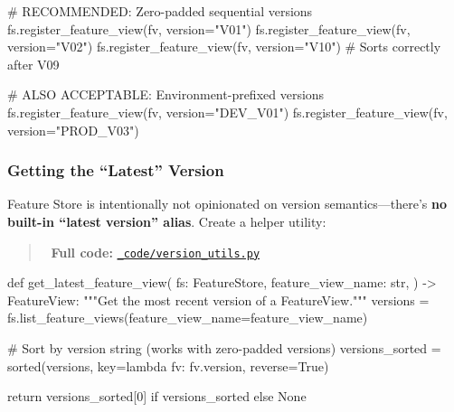 \documentclass[
  letterpaper,
  DIV=11,
  numbers=noendperiod]{scrreprt}
\newenvironment{Shaded}{\begin{snugshade}}{\end{snugshade}}
\newcommand{\BuiltInTok}[1]{\textcolor[rgb]{0.00,0.23,0.31}{#1}}
\newcommand{\CommentTok}[1]{\textcolor[rgb]{0.37,0.37,0.37}{#1}}
\newcommand{\ControlFlowTok}[1]{\textcolor[rgb]{0.00,0.23,0.31}{#1}}
\newcommand{\DecValTok}[1]{\textcolor[rgb]{0.68,0.00,0.00}{#1}}
\newcommand{\KeywordTok}[1]{\textcolor[rgb]{0.00,0.23,0.31}{#1}}
\newcommand{\NormalTok}[1]{\textcolor[rgb]{0.00,0.23,0.31}{#1}}
\newcommand{\OperatorTok}[1]{\textcolor[rgb]{0.37,0.37,0.37}{#1}}
\newcommand{\StringTok}[1]{\textcolor[rgb]{0.13,0.47,0.30}{#1}}
\newcommand{\VariableTok}[1]{\textcolor[rgb]{0.07,0.07,0.07}{#1}}
\begin{document}
\begin{Shaded}
\begin{Highlighting}[]
\CommentTok{\# RECOMMENDED: Zero{-}padded sequential versions}
\NormalTok{fs.register\_feature\_view(fv, version}\OperatorTok{=}\StringTok{"V01"}\NormalTok{)}
\NormalTok{fs.register\_feature\_view(fv, version}\OperatorTok{=}\StringTok{"V02"}\NormalTok{)}
\NormalTok{fs.register\_feature\_view(fv, version}\OperatorTok{=}\StringTok{"V10"}\NormalTok{)  }\CommentTok{\# Sorts correctly after V09}

\CommentTok{\# ALSO ACCEPTABLE: Environment{-}prefixed versions}
\NormalTok{fs.register\_feature\_view(fv, version}\OperatorTok{=}\StringTok{"DEV\_V01"}\NormalTok{)}
\NormalTok{fs.register\_feature\_view(fv, version}\OperatorTok{=}\StringTok{"PROD\_V03"}\NormalTok{)}
\end{Highlighting}
\end{Shaded}

\hypertarget{getting-the-latest-version}{%
\subsubsection{Getting the ``Latest''
Version}\label{getting-the-latest-version}}

Feature Store is intentionally not opinionated on version
semantics---there's \textbf{no built-in ``latest version'' alias}.
Create a helper utility:

\begin{quote}
📁 \textbf{Full code:}
\href{_code/version_utils.py}{\texttt{\_code/version\_utils.py}}
\end{quote}

\begin{Shaded}
\begin{Highlighting}[]
\KeywordTok{def}\NormalTok{ get\_latest\_feature\_view(}
\NormalTok{    fs: FeatureStore,}
\NormalTok{    feature\_view\_name: }\BuiltInTok{str}\NormalTok{,}
\NormalTok{) }\OperatorTok{{-}\textgreater{}}\NormalTok{ FeatureView:}
    \CommentTok{"""Get the most recent version of a FeatureView."""}
\NormalTok{    versions }\OperatorTok{=}\NormalTok{ fs.list\_feature\_views(feature\_view\_name}\OperatorTok{=}\NormalTok{feature\_view\_name)}
    
    \CommentTok{\# Sort by version string (works with zero{-}padded versions)}
\NormalTok{    versions\_sorted }\OperatorTok{=} \BuiltInTok{sorted}\NormalTok{(versions, key}\OperatorTok{=}\KeywordTok{lambda}\NormalTok{ fv: fv.version, reverse}\OperatorTok{=}\VariableTok{True}\NormalTok{)}
    
    \ControlFlowTok{return}\NormalTok{ versions\_sorted[}\DecValTok{0}\NormalTok{] }\ControlFlowTok{if}\NormalTok{ versions\_sorted }\ControlFlowTok{else} \VariableTok{None}
\end{Highlighting}
\end{Shaded}
\end{document}
